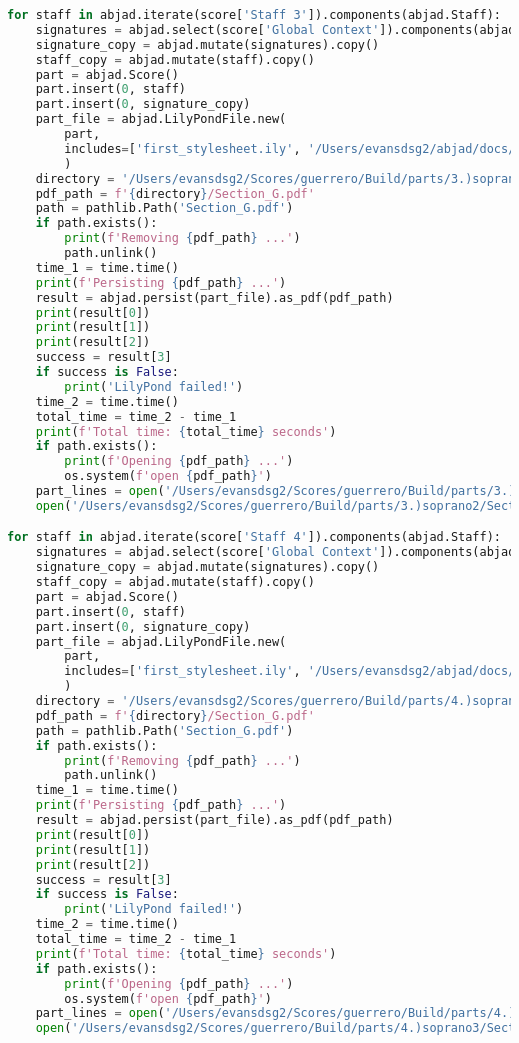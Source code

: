 \begin{lstlisting}[language=Python, caption=Invocation Source Code]
for staff in abjad.iterate(score['Staff 3']).components(abjad.Staff):
    signatures = abjad.select(score['Global Context']).components(abjad.Staff)
    signature_copy = abjad.mutate(signatures).copy()
    staff_copy = abjad.mutate(staff).copy()
    part = abjad.Score()
    part.insert(0, staff)
    part.insert(0, signature_copy)
    part_file = abjad.LilyPondFile.new(
        part,
        includes=['first_stylesheet.ily', '/Users/evansdsg2/abjad/docs/source/_stylesheets/abjad.ily'],
        )
    directory = '/Users/evansdsg2/Scores/guerrero/Build/parts/3.)soprano2'
    pdf_path = f'{directory}/Section_G.pdf'
    path = pathlib.Path('Section_G.pdf')
    if path.exists():
        print(f'Removing {pdf_path} ...')
        path.unlink()
    time_1 = time.time()
    print(f'Persisting {pdf_path} ...')
    result = abjad.persist(part_file).as_pdf(pdf_path)
    print(result[0])
    print(result[1])
    print(result[2])
    success = result[3]
    if success is False:
        print('LilyPond failed!')
    time_2 = time.time()
    total_time = time_2 - time_1
    print(f'Total time: {total_time} seconds')
    if path.exists():
        print(f'Opening {pdf_path} ...')
        os.system(f'open {pdf_path}')
    part_lines = open('/Users/evansdsg2/Scores/guerrero/Build/parts/3.)soprano2/Section_G.ly').readlines()
    open('/Users/evansdsg2/Scores/guerrero/Build/parts/3.)soprano2/Section_G.ly', 'w').writelines(part_lines[15:-1])

for staff in abjad.iterate(score['Staff 4']).components(abjad.Staff):
    signatures = abjad.select(score['Global Context']).components(abjad.Staff)
    signature_copy = abjad.mutate(signatures).copy()
    staff_copy = abjad.mutate(staff).copy()
    part = abjad.Score()
    part.insert(0, staff)
    part.insert(0, signature_copy)
    part_file = abjad.LilyPondFile.new(
        part,
        includes=['first_stylesheet.ily', '/Users/evansdsg2/abjad/docs/source/_stylesheets/abjad.ily'],
        )
    directory = '/Users/evansdsg2/Scores/guerrero/Build/parts/4.)soprano3'
    pdf_path = f'{directory}/Section_G.pdf'
    path = pathlib.Path('Section_G.pdf')
    if path.exists():
        print(f'Removing {pdf_path} ...')
        path.unlink()
    time_1 = time.time()
    print(f'Persisting {pdf_path} ...')
    result = abjad.persist(part_file).as_pdf(pdf_path)
    print(result[0])
    print(result[1])
    print(result[2])
    success = result[3]
    if success is False:
        print('LilyPond failed!')
    time_2 = time.time()
    total_time = time_2 - time_1
    print(f'Total time: {total_time} seconds')
    if path.exists():
        print(f'Opening {pdf_path} ...')
        os.system(f'open {pdf_path}')
    part_lines = open('/Users/evansdsg2/Scores/guerrero/Build/parts/4.)soprano3/Section_G.ly').readlines()
    open('/Users/evansdsg2/Scores/guerrero/Build/parts/4.)soprano3/Section_G.ly', 'w').writelines(part_lines[15:-1])


\end{lstlisting}
